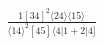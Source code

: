 \documentclass[varwidth, border=5pt]{standalone}
\begin{document}
\begin{my}
$\begin{gathered}
\scriptscriptstyle\frac{1[34]^2⟨24⟩⟨15⟩}{⟨14⟩^2[45]⟨4|1+2|4]}
\end{gathered}$
\end{my}
\end{document}
